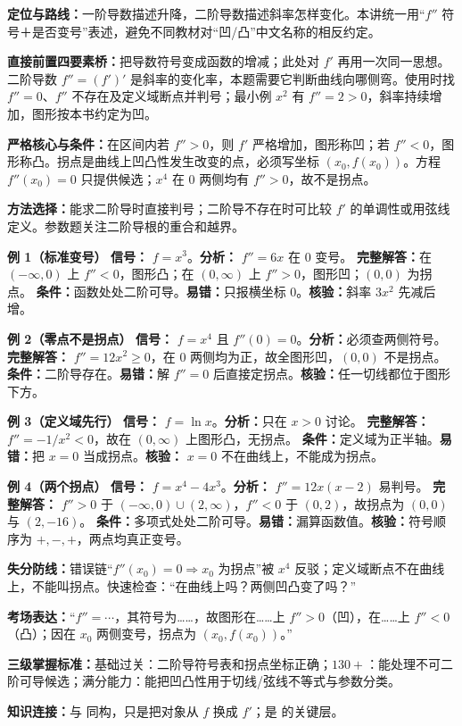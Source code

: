 \begin{knowledgeBox}
\textbf{定位与路线：}一阶导数描述升降，二阶导数描述斜率怎样变化。本讲统一用“\(f''\) 符号＋是否变号”表述，避免不同教材对“凹/凸”中文名称的相反约定。

\textbf{直接前置四要素桥：}把导数符号变成函数的增减；此处对 \(f'\) 再用一次同一思想。二阶导数 \(f''=(f')'\) 是斜率的变化率，本题需要它判断曲线向哪侧弯。使用时找 \(f''=0\)、\(f''\) 不存在及定义域断点并判号；最小例 \(x^2\) 有 \(f''=2>0\)，斜率持续增加，图形按本书约定为凹。

\textbf{严格核心与条件：}在区间内若 \(f''>0\)，则 \(f'\) 严格增加，图形称凹；若 \(f''<0\)，图形称凸。拐点是曲线上凹凸性发生改变的点，必须写坐标 \((x_0,f(x_0))\)。方程 \(f''(x_0)=0\) 只提供候选；\(x^4\) 在 \(0\) 两侧均有 \(f''>0\)，故不是拐点。

\textbf{方法选择：}能求二阶导时直接判号；二阶导不存在时可比较 \(f'\) 的单调性或用弦线定义。参数题关注二阶导根的重合和越界。

\textbf{例 1（标准变号）}\quad
\textbf{信号：} \(f=x^3\)。\textbf{分析：} \(f''=6x\) 在 \(0\) 变号。
\textbf{完整解答：}在 \((-\infty,0)\) 上 \(f''<0\)，图形凸；在 \((0,\infty)\) 上 \(f''>0\)，图形凹；\((0,0)\) 为拐点。
\textbf{条件：}函数处处二阶可导。\textbf{易错：}只报横坐标 \(0\)。\textbf{核验：}斜率 \(3x^2\) 先减后增。

\textbf{例 2（零点不是拐点）}\quad
\textbf{信号：} \(f=x^4\) 且 \(f''(0)=0\)。\textbf{分析：}必须查两侧符号。
\textbf{完整解答：} \(f''=12x^2\ge0\)，在 \(0\) 两侧均为正，故全图形凹，\((0,0)\) 不是拐点。
\textbf{条件：}二阶导存在。\textbf{易错：}解 \(f''=0\) 后直接定拐点。\textbf{核验：}任一切线都位于图形下方。

\textbf{例 3（定义域先行）}\quad
\textbf{信号：} \(f=\ln x\)。\textbf{分析：}只在 \(x>0\) 讨论。
\textbf{完整解答：} \(f''=-1/x^2<0\)，故在 \((0,\infty)\) 上图形凸，无拐点。
\textbf{条件：}定义域为正半轴。\textbf{易错：}把 \(x=0\) 当成拐点。\textbf{核验：} \(x=0\) 不在曲线上，不能成为拐点。

\textbf{例 4（两个拐点）}\quad
\textbf{信号：} \(f=x^4-4x^3\)。\textbf{分析：} \(f''=12x(x-2)\) 易判号。
\textbf{完整解答：} \(f''>0\) 于 \((-\infty,0)\cup(2,\infty)\)，\(f''<0\) 于 \((0,2)\)，故拐点为 \((0,0)\) 与 \((2,-16)\)。
\textbf{条件：}多项式处处二阶可导。\textbf{易错：}漏算函数值。\textbf{核验：}符号顺序为 \(+,-,+\)，两点均真正变号。

\textbf{失分防线：}错误链“\(f''(x_0)=0\Rightarrow x_0\) 为拐点”被 \(x^4\) 反驳；定义域断点不在曲线上，不能叫拐点。快速检查：“在曲线上吗？两侧凹凸变了吗？”

\textbf{考场表达：}“\(f''=\cdots\)，其符号为……，故图形在……上 \(f''>0\)（凹），在……上 \(f''<0\)（凸）；因在 \(x_0\) 两侧变号，拐点为 \((x_0,f(x_0))\)。”

\textbf{三级掌握标准：}基础过关：二阶导符号表和拐点坐标正确；\(130+\)：能处理不可二阶可导候选；满分能力：能把凹凸性用于切线/弦线不等式与参数分类。

\textbf{知识连接：}与 同构，只是把对象从 \(f\) 换成 \(f'\)；是 的关键层。
\end{knowledgeBox}

